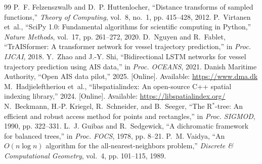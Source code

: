\documentclass[conference]{IEEEtran}
\begin{document}
\begin{thebibliography}{99}
 P.~F. Felzenszwalb and D.~P. Huttenlocher, ``Distance transforms of sampled functions,'' \emph{Theory of Computing}, vol.~8, no.~1, pp. 415--428, 2012.
 P.~Virtanen et~al., ``{SciPy 1.0}: Fundamental algorithms for scientific computing in {P}ython,'' \emph{Nature Methods}, vol.~17, pp. 261--272, 2020.
 D.~Nguyen and R.~Fablet, ``{TrAISformer}: A transformer network for vessel trajectory prediction,'' in \emph{Proc. IJCAI}, 2018.
 Y.~Zhao and J.-Y. Shi, ``Bidirectional LSTM networks for vessel trajectory prediction using AIS data,'' in \emph{Proc. OCEANS}, 2021.
 Danish Maritime Authority, ``Open {AIS} data pilot,'' 2025. [Online]. Available: \url{https://www.dma.dk}
 M.~Hadjieleftheriou et~al., ``libspatialindex: An open-source {C++} spatial indexing library,'' 2024. [Online]. Available: \url{https://libspatialindex.org/}
 N.~Beckmann, H.-P. Kriegel, R.~Schneider, and B.~Seeger, ``The {R$^*$}-tree: An efficient and robust access method for points and rectangles,'' in \emph{Proc. SIGMOD}, 1990, pp. 322--331.
 L.~J. Guibas and R.~Sedgewick, ``A dichromatic framework for balanced trees,'' in \emph{Proc. FOCS}, 1978, pp. 8--21.
 P.~M. Vaidya, ``An $O(n\log n)$ algorithm for the all-nearest-neighbors problem,'' \emph{Discrete \& Computational Geometry}, vol.~4, pp. 101--115, 1989.
\end{thebibliography}

\clearpage
\appendices

\end{document}
